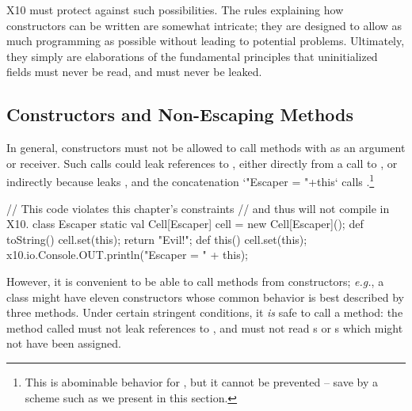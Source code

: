 X10 must protect against such possibilities.  The rules explaining how
constructors can be written are somewhat intricate; they are designed to allow
as much programming as possible without leading to potential problems.
Ultimately, they simply are elaborations of the fundamental principles that
uninitialized fields must never be read, and  must never be leaked.




\subsection{Constructors and Non-Escaping Methods}
\label{sect:nonescaping}

In general, constructors must not be allowed to call methods with  as
an argument or receiver. Such calls could leak references to ,
either directly from a call to , or indirectly because
 leaks , and the concatenation
\Xcd`"Escaper = "+this` calls .\footnote{This is abominable behavior for
, but it cannot be prevented -- save by a scheme such as we
present in this section.}
\begin{xten}
// This code violates this chapter's constraints
// and thus will not compile in X10.
class Escaper {
  static val Cell[Escaper] cell = new Cell[Escaper]();
  def toString() {
    cell.set(this);
    return "Evil!";
  }
  def this() {
    cell.set(this);
    x10.io.Console.OUT.println("Escaper = " + this);
  }
}
\end{xten}
%

However, it is convenient to be able to call methods from constructors; {\em
e.g.}, a class might have eleven constructors whose common behavior is best
described by three methods.
Under certain stringent conditions, it {\em is}
safe to call a method: the method called must not leak references to
, and must not read s or s which might not have
been assigned.

